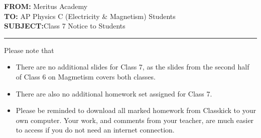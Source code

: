 \documentclass[letterpaper,11pt]{article}
\begin{document}
\textbf{FROM:}\tabto{1.3in} Meritus Academy\\
\textbf{TO:}\tabto{1.3in} AP Physics C (Electricity \& Magnetism) Students\\
\textbf{SUBJECT:}\tabto{1.3in}Class 7 Notice to Students

\vspace{.2in}\hrule

Please note that

\begin{itemize}[itemsep=4pt,topsep=0pt,leftmargin=15pt]
\item There are no additional slides for Class 7, as the slides from the second
  half of Class 6 on Magmetism covers both classes.

\item There are also no additional homework set assigned for Class 7.

\item Please be reminded to download all marked homework from Classkick to your
  own computer. Your work, and comments from your teacher, are much easier to
  access if you do not need an internet connection.
\end{itemize}
\end{document}

